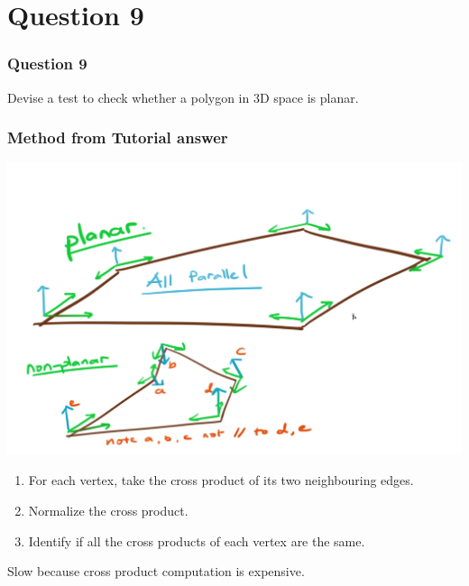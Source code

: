 \documentclass{beamer}
\begin{document}
\section{Question 9}

\begin{frame}
    \frametitle{Question 9}
    Devise a test to check whether a polygon in 3D space is planar.
\end{frame}

\begin{frame}
    \frametitle{Method from Tutorial answer}

    \begin{center}
        \includegraphics[scale=0.25]{planar.png}
    \end{center}

    \begin{enumerate}
        \item For each vertex, take the cross product of its two neighbouring edges.
        \item Normalize the cross product.
        \item Identify if all the cross products of each vertex are the same.
    \end{enumerate}

    \begin{tcolorbox}
        Slow because cross product computation is expensive.
    \end{tcolorbox}
    
\end{frame}
\end{document}
